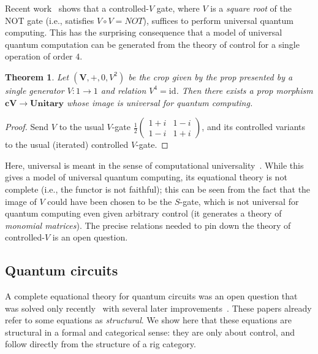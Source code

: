 \documentclass[a4paper]{article}
\theoremstyle{plain}
\newtheorem{theorem}{Theorem}
\theoremstyle{definition}
\newcommand{\cat}[1]{\mathbf{#1}}
\newcommand{\ccat}[1]{\mathbf{c #1}}
\newcommand{\id}{\mathrm{id}}
\begin{document}
Recent work~\cite{kaarsgaard:ctrlv} shows that a controlled-$V$ gate,
where $V$ is a \emph{square root} of the NOT gate (i.e., satisfies $V
\circ V = NOT$), suffices to perform universal quantum computing. This
has the surprising consequence that a model of universal quantum
computation can be generated from the theory of control for a single
operation of order $4$.

\begin{theorem}
 Let $(\cat{V},+,0,V^2)$ be the crop given by the prop presented by a
 single generator $V : 1 \to 1$ and relation $V^4 = \id$. Then there
 exists a prop morphism $\ccat{\cat{V}} \to \cat{Unitary}$ whose
 image is universal for quantum computing.
\end{theorem}
\begin{proof}
 Send $V$ to the usual $V$-gate $\tfrac{1}{2}\left(\begin{smallmatrix}
 1+i & 1-i \\ 1-i & 1+i
 \end{smallmatrix}\right)$, and its controlled variants to the usual
 (iterated) controlled $V$-gate.
\end{proof}

Here, universal is meant in the sense of computational universality~\cite{aharonov:toffolihadamard}.
While this gives a model of universal quantum computing, its
equational theory is not complete (i.e., the functor is not faithful);
this can be seen from the fact that the image of $V$ could have been
chosen to be the $S$-gate, which is not universal for quantum
computing even given arbitrary control (it generates a theory of
\emph{monomial matrices}). The precise relations needed to pin down
the theory of controlled-$V$ is an open question.

\subsection{Quantum circuits}

A complete equational theory for quantum circuits was an open question that was
solved only recently~\cite{clementetal:complete} with several later
improvements~\cite{clementetal:extensions, clementetal:minimal,
delorme2025control}. These papers already refer to some equations as
\emph{structural}. We show here that these equations are structural in a formal
and categorical sense: they are only about control, and follow directly from the
structure of a rig category.
\end{document}
